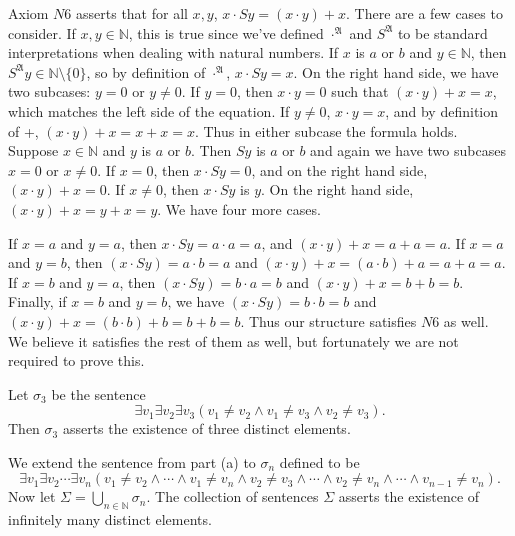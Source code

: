 \documentclass[11pt]{hmcpset}
\newenvironment{problem2}[1]{\noindent {\bf (#1}}
{\medskip}
\newenvironment{problem1}[1]{\noindent {\bf Problem #1}}
{\medskip}
\begin{document}
\begin{problem1}{1}
Axiom $N6$ asserts that for all $x,y$, $x\cdot Sy=(x\cdot y)+x$. There are a few cases to consider. If $x,y\in\mathbb{N}$, this is true since we've defined $\cdot^\mathfrak{A}$ and $S^\mathfrak{A}$ to be standard interpretations when dealing with natural numbers. If $x$ is $a$ or $b$ and $y\in\mathbb{N}$, then $S^\mathfrak{A}y\in\mathbb{N}\setminus \{0\}$, so by definition of $\cdot^\mathfrak{A}$, $x\cdot Sy=x$. On the right hand side, we have two subcases: $y=0$ or $y\ne 0$. If $y=0$, then $x\cdot y=0$ such that $(x\cdot y)+x =x$, which matches the left side of the equation. If $y\ne 0$, $x\cdot y=x$, and by definition of +, $(x\cdot y)+x=x+x=x$. Thus in either subcase the formula holds. Suppose $x\in\mathbb{N}$ and $y$ is $a$ or $b$. Then $Sy$ is $a$ or $b$ and again we have two subcases $x=0$ or $x\ne 0$. If $x=0$, then $x\cdot Sy=0$, and on the right hand side, $(x\cdot y)+x=0$. If $x\ne 0$, then $x\cdot Sy$ is $y$. On the right hand side, $(x\cdot y)+x=y+x=y$. We have four more cases.

If $x=a$ and $y=a$, then $x\cdot Sy=a\cdot a=a$, and $(x\cdot y) +x=a+a=a$. If $x=a$ and $y=b$, then $(x\cdot Sy)=a\cdot b=a$ and $(x\cdot y) + x=(a\cdot b) +a=a+a=a$. If $x=b$ and $y=a$, then $(x\cdot Sy)=b\cdot a=b$ and $(x\cdot y) + x=b+b=b$. Finally, if $x=b$ and $y=b$, we have $(x\cdot Sy)=b\cdot b=b$ and $(x\cdot y)+x=(b\cdot b)+b=b+b=b$. Thus our structure satisfies $N6$ as well. We believe it satisfies the rest of them as well, but fortunately we are not required to prove this.
\end{problem1}

\begin{problem1}{2(a)} Let $\sigma_3$ be the sentence $$\exists v_1\exists v_2\exists v_3 (v_1\ne v_2 \land v_1\ne v_3 \land v_2\ne v_3).$$ Then $\sigma_3$ asserts the existence of three distinct elements.
\end{problem1}

\begin{problem2}{b)} We extend the sentence from part (a) to $\sigma_n$ defined to be $$\exists v_1 \exists v_2\cdots\exists v_n(v_1\ne v_2 \land\cdots\land v_1\ne v_n\land v_2\ne v_3\land\cdots\land v_2\ne v_n\land\cdots\land v_{n-1}\ne v_n).$$ Now let $\Sigma=\bigcup_{n\in\mathbb{N}}\sigma_n$. The collection of sentences $\Sigma$ asserts the existence of infinitely many distinct elements.
\end{problem2}
\end{document}
